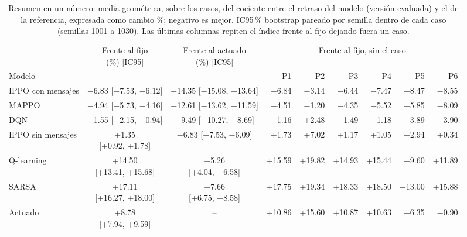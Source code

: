 \begin{table}[H]
\centering
\scriptsize
\setlength{\tabcolsep}{3pt}
\begin{tabular}{lccrrrrrr}
\toprule
 & \makecell{Frente al fijo\\(\%) [IC95]} & \makecell{Frente al actuado\\(\%) [IC95]} & \multicolumn{6}{c}{Frente al fijo, sin el caso} \\
\cmidrule(lr){4-9}
Modelo & & & P1 & P2 & P3 & P4 & P5 & P6 \\
\midrule
IPPO con mensajes & \makecell[c]{$-$6.83\\{}[$-$7.53, $-$6.12]} & \makecell[c]{$-$14.35\\{}[$-$15.08, $-$13.64]} & $-$6.84 & $-$3.14 & $-$6.44 & $-$7.47 & $-$8.47 & $-$8.55 \\
MAPPO & \makecell[c]{$-$4.94\\{}[$-$5.73, $-$4.16]} & \makecell[c]{$-$12.61\\{}[$-$13.62, $-$11.59]} & $-$4.51 & $-$1.20 & $-$4.35 & $-$5.52 & $-$5.85 & $-$8.09 \\
DQN & \makecell[c]{$-$1.55\\{}[$-$2.15, $-$0.94]} & \makecell[c]{$-$9.49\\{}[$-$10.27, $-$8.69]} & $-$1.16 & +2.48 & $-$1.49 & $-$1.18 & $-$3.89 & $-$3.90 \\
IPPO sin mensajes & \makecell[c]{+1.35\\{}[+0.92, +1.78]} & \makecell[c]{$-$6.83\\{}[$-$7.53, $-$6.09]} & +1.73 & +7.02 & +1.17 & +1.05 & $-$2.94 & +0.34 \\
Q-learning & \makecell[c]{+14.50\\{}[+13.41, +15.68]} & \makecell[c]{+5.26\\{}[+4.04, +6.58]} & +15.59 & +19.82 & +14.93 & +15.44 & +9.60 & +11.89 \\
SARSA & \makecell[c]{+17.11\\{}[+16.27, +18.00]} & \makecell[c]{+7.66\\{}[+6.75, +8.58]} & +17.75 & +19.34 & +18.33 & +18.50 & +13.00 & +15.88 \\
Actuado & \makecell[c]{+8.78\\{}[+7.94, +9.59]} & -- & +10.86 & +15.60 & +10.87 & +10.63 & +6.35 & $-$0.90 \\
\bottomrule
\end{tabular}
\caption[Resumen en un número]{Resumen en un número: media geométrica, sobre los casos, del cociente entre el retraso del modelo (versión evaluada) y el de la referencia, expresada como cambio \%; negativo es mejor. IC95\,\% bootstrap pareado por semilla dentro de cada caso (semillas 1001 a 1030). Las últimas columnas repiten el índice frente al fijo dejando fuera un caso.}
\label{tab:plan2-numero-unico}
\end{table}
